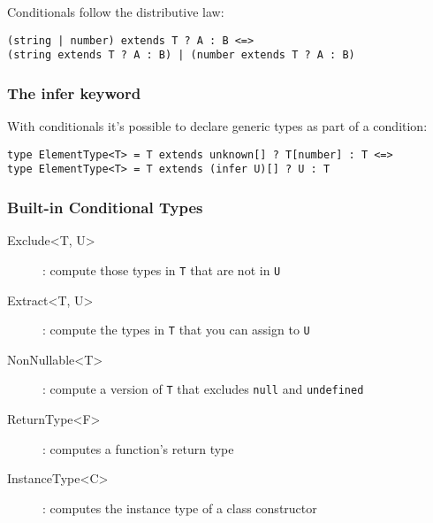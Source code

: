\documentclass[french]{article}
\begin{document}
Conditionals follow the distributive law:

\begin{lstlisting}
(string | number) extends T ? A : B <=>
(string extends T ? A : B) | (number extends T ? A : B)
\end{lstlisting}

\subsubsection*{The infer keyword}

With conditionals it's possible to declare generic types as part of a condition:
\begin{lstlisting}
type ElementType<T> = T extends unknown[] ? T[number] : T <=>
type ElementType<T> = T extends (infer U)[] ? U : T
\end{lstlisting}

\subsubsection*{Built-in Conditional Types}

\begin{description}
\item[Exclude<T, U>]: compute those types in \lstinline{T} that are not in \lstinline{U}
\item[Extract<T, U>]: compute the types in \lstinline{T} that you can assign to \lstinline{U}
\item[NonNullable<T>]: compute a version of \lstinline{T} that excludes \lstinline{null} and \lstinline{undefined} 
\item[ReturnType<F>]: computes a function's return type
\item[InstanceType<C>]: computes the instance type of a class constructor
\end{description}
\end{document}
